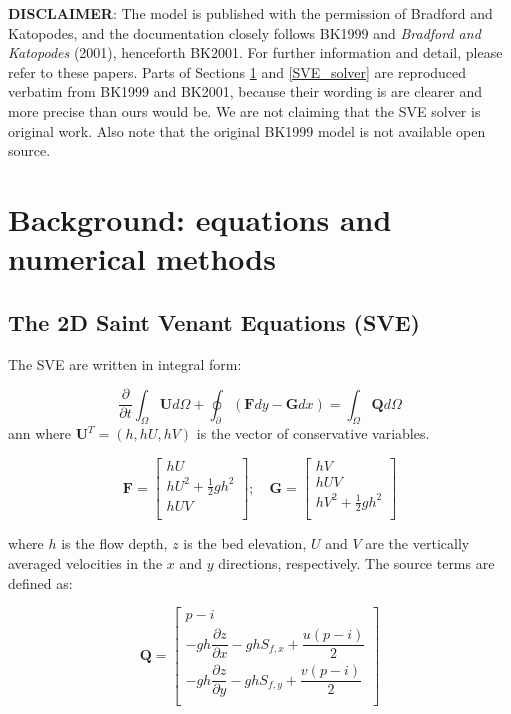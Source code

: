\documentclass{article}
\begin{document}
\textbf{DISCLAIMER}:
The model is published with the permission of Bradford and Katopodes, and the documentation closely follows BK1999 and  \textit{Bradford and Katopodes} (2001), henceforth BK2001. For further information and detail, please refer to these papers.  Parts of Sections \ref{SVE} and \ref{SVE_solver} are reproduced verbatim from BK1999 and BK2001, because their wording is are clearer and more precise than ours would be.  We are not claiming that the SVE solver is original work.  Also note that the original BK1999 model is not available open source.
  
\section{Background: equations and numerical methods }
\label{SVE}

\subsection{The 2D Saint Venant Equations (SVE)}
The SVE are written in integral form:

\begin{equation}
	\dfrac{\partial}{\partial t} \int_\Omega \mathbf{U} d\Omega + \oint_\partial (\mathbf{F} dy - \mathbf{G} dx ) = \int_\Omega \mathbf{Q} d\Omega
\end{equation}
ann
where $\mathbf{U}^T = (h, hU, hV) $ is the vector of conservative variables. 


\[ \mathbf{F} = 
\begin{bmatrix}
	h U  \\
	h U^2 + \frac{1}{2} g h^2 \\
	h U V \\
\end{bmatrix}  ; \quad
\mathbf{G} = 
\begin{bmatrix}
	h V \\
	h U V \\
	h V^2 + \frac{1}{2} g h^2 \\	
\end{bmatrix}  
\]

where $h$ is the flow depth,  $z$ is the bed elevation, $U$ and $V$ are the vertically averaged velocities in the $x$ and $y$ directions, respectively. 
The source terms are defined as:


 \[ \mathbf{Q} = 
 \begin{bmatrix}
	p - i  \\[.1cm]
	- g h \dfrac{\partial z}{\partial x} - g h  S_{f,x} + \dfrac{u(p-i)}{2}\\[.1cm]
	- g h \dfrac{\partial z}{\partial y} - g h  S_{f,y} + \dfrac{v(p-i)}{2}\\[.1cm]
\end{bmatrix} 
\]
\end{document}

